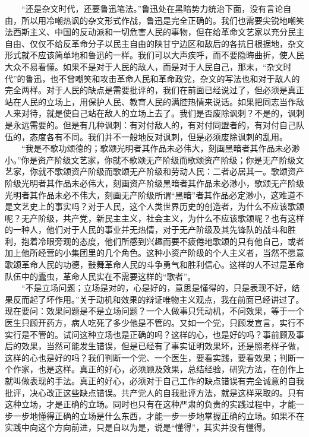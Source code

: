 \documentclass[cn,11pt,chinese]{elegantbook}
\begin{document}
　　“还是杂文时代，还要鲁迅笔法。”鲁迅处在黑暗势力统治下面，没有言论自由，所以用冷嘲热讽的杂文形式作战，鲁迅是完全正确的。我们也需要尖锐地嘲笑法西斯主义、中国的反动派和一切危害人民的事物，但在给革命文艺家以充分民主自由、仅仅不给反革命分子以民主自由的陕甘宁边区和敌后的各抗日根据地，杂文形式就不应该简单地和鲁迅的一样。我们可以大声疾呼，而不要隐晦曲折，使人民大众不易看懂。如果不是对于人民的敌人，而是对于人民自己，那末，“杂文时代”的鲁迅，也不曾嘲笑和攻击革命人民和革命政党，杂文的写法也和对于敌人的完全两样。对于人民的缺点是需要批评的，我们在前面已经说过了，但必须是真正站在人民的立场上，用保护人民、教育人民的满腔热情来说话。如果把同志当作敌人来对待，就是使自己站在敌人的立场上去了。我们是否废除讽刺？不是的，讽刺是永远需要的。但是有几种讽刺：有对付敌人的，有对付同盟者的，有对付自己队伍的，态度各有不同。我们并不一般地反对讽刺，但是必须废除讽刺的乱用。\\
　　“我是不歌功颂德的；歌颂光明者其作品未必伟大，刻画黑暗者其作品未必渺小。”你是资产阶级文艺家，你就不歌颂无产阶级而歌颂资产阶级；你是无产阶级文艺家，你就不歌颂资产阶级而歌颂无产阶级和劳动人民：二者必居其一。歌颂资产阶级光明者其作品未必伟大，刻画资产阶级黑暗者其作品未必渺小，歌颂无产阶级光明者其作品未必不伟大，刻画无产阶级所谓“黑暗”者其作品必定渺小，这难道不是文艺史上的事实吗？对于人民，这个人类世界历史的创造者，为什么不应该歌颂呢？无产阶级，共产党，新民主主义，社会主义，为什么不应该歌颂呢？也有这样的一种人，他们对于人民的事业并无热情，对于无产阶级及其先锋队的战斗和胜利，抱着冷眼旁观的态度，他们所感到兴趣而要不疲倦地歌颂的只有他自己，或者加上他所经营的小集团里的几个角色。这种小资产阶级的个人主义者，当然不愿意歌颂革命人民的功德，鼓舞革命人民的斗争勇气和胜利信心。这样的人不过是革命队伍中的蠹虫，革命人民实在不需要这样的“歌者”。\\
　　“不是立场问题；立场是对的，心是好的，意思是懂得的，只是表现不好，结果反而起了坏作用。”关于动机和效果的辩证唯物主义观点，我在前面已经讲过了。现在要问：效果问题是不是立场问题？一个人做事只凭动机，不问效果，等于一个医生只顾开药方，病人吃死了多少他是不管的。又如一个党，只顾发宣言，实行不实行是不管的。试问这种立场也是正确的吗？这样的心，也是好的吗？事前顾及事后的效果，当然可能发生错误，但是已经有了事实证明效果坏，还是照老样子做，这样的心也是好的吗？我们判断一个党、一个医生，要看实践，要看效果；判断一个作家，也是这样。真正的好心，必须顾及效果，总结经验，研究方法，在创作上就叫做表现的手法。真正的好心，必须对于自己工作的缺点错误有完全诚意的自我批评，决心改正这些缺点错误。共产党人的自我批评方法，就是这样采取的。只有这种立场，才是正确的立场。同时也只有在这种严肃的负责的实践过程中，才能一步一步地懂得正确的立场是什么东西，才能一步一步地掌握正确的立场。如果不在实践中向这个方向前进，只是自以为是，说是“懂得”，其实并没有懂得。\\
\end{document}
